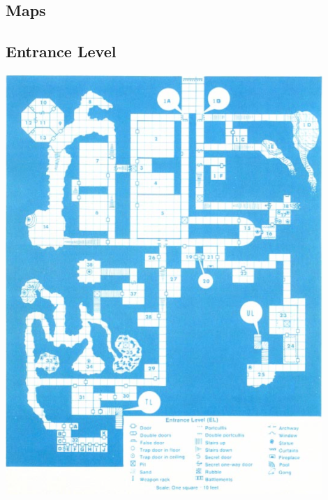 \documentclass[palace_of_the_silver_princess]{subfiles}
\begin{document}
\selectfont
\clearpage

\begin{onecolumn}
\section{Maps}

\subsection{Entrance Level}
\begin{center}
	\includegraphics[width=0.9\textwidth,height=0.9\textheight]{img/EL_map.png}
\end{center}
\clearpage


\end{onecolumn}
\end{document}
